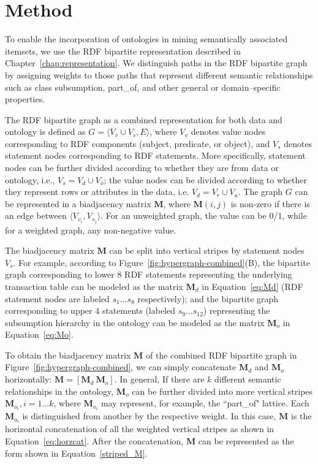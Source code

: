 
\section{Method}

To enable the incorporation of ontologies in mining semantically associated itemsets, we use the RDF bipartite representation described in Chapter~\ref{chap:representation}. We distinguish paths in the RDF bipartite graph by assigning weights to those paths that represent different semantic relationships such as class subsumption, part\_of, and other general or domain--specific properties.

The RDF bipartite graph as a combined representation for both data and ontology is defined as $G=\langle V_v \cup V_s, E \rangle$, where $V_v$ denotes value nodes corresponding to RDF components (subject, predicate, or object), and $V_s$ denotes statement nodes corresponding to RDF statements. More specifically, statement nodes can be further divided according to whether they are from data or ontology, i.e., $V_s=V_d \cup V_o$; the value nodes can be divided according to whether they represent rows or attributes in the data, i.e. $V_d=V_r \cup V_a$. The graph $G$ can be represented in a biadjacency matrix $\mathbf{M}$, where $\mathbf{M}(i,j)$ is non-zero if there is an edge between $\langle V_{v_i}, V_{s_j} \rangle$. For an unweighted graph, the value can be 0/1, while for a weighted graph, any non-negative value.

The biadjacency matrix $\mathbf{M}$ can be split into vertical stripes by statement nodes $V_s$. For example, according to Figure~\ref{fig:hypergraph-combined}(B), the bipartite graph corresponding to lower 8 RDF statements representing the underlying transaction table can be modeled as the matrix $\mathbf{M}_d$ in Equation~\ref{eq:Md} (RDF statement nodes are labeled $s_1\dots s_8$ respectively); and the bipartite graph corresponding to upper 4 statements (labeled $s_9\dots s_{12}$) representing the subsumption hierarchy in the ontology can be modeled as the matrix $\mathbf{M}_o$ in Equation~\ref{eq:Mo}.

To obtain the biadjacency matrix $\mathbf{M}$ of the combined RDF bipartite graph in Figure~\ref{fig:hypergraph-combined}, we can simply concatenate $\mathbf{M}_d$ and $\mathbf{M}_o$ horizontally: $\mathbf{M}=\left[\mathbf{M}_d~\mathbf{M}_o\right]$. In general, If there are $k$ different semantic relationships in the ontology, $\mathbf{M}_o$ can be further divided into more vertical stripes $\mathbf{M}_{o_i}, i=1\dots k$, where $\mathbf{M}_{o_i}$ may represent, for example, the ``part\_of" lattice. Each $\mathbf{M}_{o_i}$ is  distinguished from another by the respective weight. In this case, $\mathbf{M}$ is the horizontal concatenation of all the weighted vertical stripes as shown in Equation~\ref{eq:horzcat}. After the concatenation, $\mathbf{M}$ can be represented as the form shown in Equation~\ref{striped_M}.

